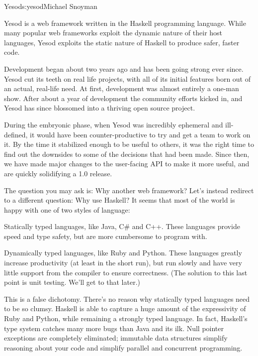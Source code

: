 \begin{aosachapter}{Yesod}{s:yesod}{Michael Snoyman}

Yesod is a web framework written in the Haskell programming
language. While many popular web frameworks exploit the dynamic nature
of their host languages, Yesod exploits the static nature of Haskell
to produce safer, faster code.

Development began about two years ago and has been going strong ever
since. Yesod cut its teeth on real life projects, with all of its
initial features born out of an actual, real-life need. At first,
development was almost entirely a one-man show. After about a year of
development the community efforts kicked in, and Yesod has since
blossomed into a thriving open source project.

During the embryonic phase, when Yesod was incredibly ephemeral and
ill-defined, it would have been counter-productive to try and get a
team to work on it. By the time it stabilized enough to be useful to
others, it was the right time to find out the downsides to some of the
decisions that had been made. Since then, we have made major changes
to the user-facing API to make it more useful, and are quickly
solidifying a 1.0 release.

The question you may ask is: Why another web framework? Let's instead
redirect to a different question: Why use Haskell? It seems that most
of the world is happy with one of two styles of language:

\begin{aosaitemize}

\item Statically typed languages, like Java, C\# and C++. These
  languages provide speed and type safety, but are more cumbersome to
  program with.

\item Dynamically typed languages, like Ruby and Python. These
  languages greatly increase productivity (at least in the short run),
  but run slowly and have very little support from the compiler to
  ensure correctness. (The solution to this last point is unit
  testing. We'll get to that later.)

\end{aosaitemize}

This is a false dichotomy. There's no reason why statically typed
languages need to be so clumsy. Haskell is able to capture a huge
amount of the expressivity of Ruby and Python, while remaining a
strongly typed language. In fact, Haskell's type system catches many
more bugs than Java and its ilk. Null pointer exceptions are
completely eliminated; immutable data structures simplify reasoning
about your code and simplify parallel and concurrent programming.


\end{aosachapter}
